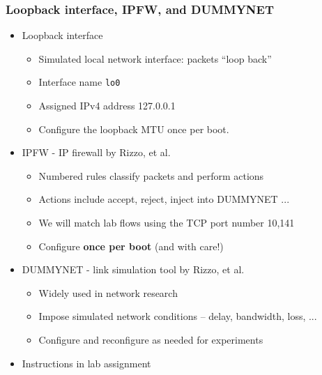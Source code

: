 \begin{frame}[fragile]
  \frametitle{Loopback interface, IPFW, and DUMMYNET}

  \begin{itemize}
    \item Loopback interface
    \begin{itemize}
      \item Simulated local network interface: packets ``loop back''
      \item Interface name \texttt{lo0}
      \item Assigned IPv4 address 127.0.0.1
      \item Configure the loopback MTU once per boot.
    \end{itemize}

    \pause

    \item IPFW - IP firewall by Rizzo, et al.
    \begin{itemize}
      \item Numbered rules classify packets and perform actions
      \item Actions include accept, reject, inject into DUMMYNET ...
      \item We will match lab flows using the TCP port number 10,141
      \item Configure \textbf{once per boot} (and with care!)
    \end{itemize}

    \pause

    \item DUMMYNET - link simulation tool by Rizzo, et al.
    \begin{itemize}
      \item Widely used in network research
      \item Impose simulated network conditions -- delay, bandwidth, loss, ...
      \item Configure and reconfigure as needed for experiments
    \end{itemize}
    \item Instructions in lab assignment
  \end{itemize}
\end{frame}


